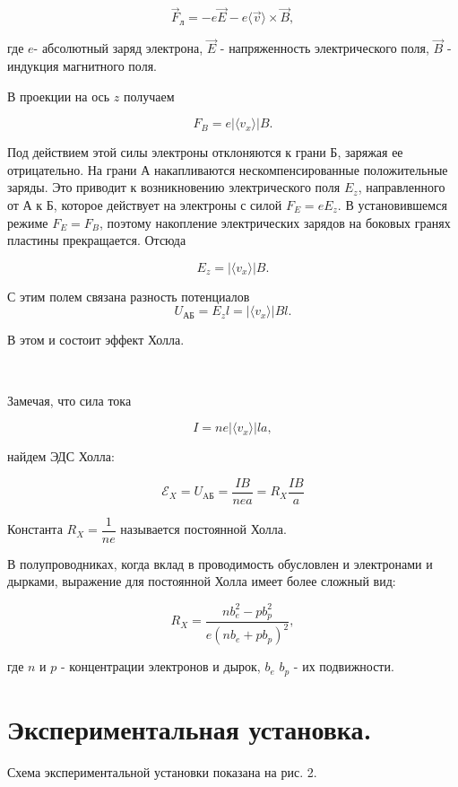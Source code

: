 \documentclass[a4paper,12pt]{article}
\begin{document}
	$$\vec{F}_{л} = -e\vec{E}-e \langle \vec{v} \rangle \times \vec{B},$$
	
	где $e$- абсолютный заряд электрона, $\vec{E}$ - напряженность электрического поля, $\vec{B}$ - индукция магнитного поля.
	
	В проекции на ось $z$ получаем
	
	$$ F_{B}=e | \langle {v_{x}} \rangle | B.$$
	
	Под действием этой силы электроны отклоняются к грани Б, заряжая ее отрицательно. На грани А накапливаются нескомпенсированные положительные заряды. Это приводит к возникновению электрического поля $E_{z}$, направленного от А к Б, которое действует на электроны с силой $F_{E}=eE_{z}$. В установившемся режиме $F_{E}=F_{B}$, поэтому накопление электрических зарядов на боковых гранях пластины прекращается. Отсюда
	
	$$ E_{z}=| \langle {v_{x}} \rangle | B.$$
	
	С этим полем связана разность потенциалов $$U_{\text{АБ}}=E_{z}l=| \langle {v_{x}} \rangle | Bl.$$
	
	В этом и состоит эффект Холла.
	
	\
	
	Замечая, что сила тока
	
	$$ I=ne| \langle {v_{x}} \rangle |la,$$
	
	найдем ЭДС Холла:
	
\begin{equation}\label{Rx}
	\mathcal{E}_{X}=U_{\text{AБ}}=\dfrac{IB}{nea}=R_{X}\dfrac{IB}{a}
\end{equation}
	
	Константа $R_{X}=\dfrac{1}{ne}$ называется постоянной Холла.
	
	В полупроводниках, когда вклад в проводимость обусловлен и электронами и дырками, выражение для постоянной Холла имеет более сложный вид:
	
	$$R_{X}=\dfrac{nb^{2}_{e}-pb^{2}_{p}}{e(nb_{e}+pb_{p})^{2}},$$
	
	где $n$ и $p$ - концентрации электронов и дырок, $b_{e}$ $b_{p}$ - их подвижности.
	
	\section{Экспериментальная установка.}
	Схема экспериментальной установки показана на рис. 2.
	
\end{document}
